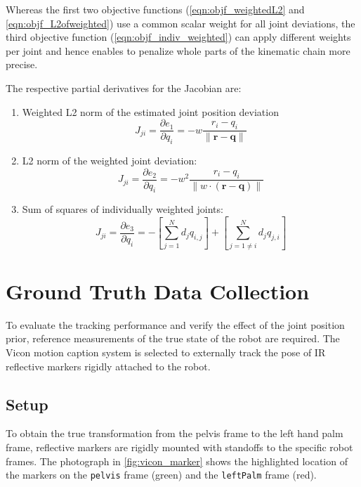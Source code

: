 Whereas the first two objective functions (\ref{eqn:objf_weightedL2} and \ref{eqn:objf_L2ofweighted}) use a common scalar weight for all joint deviations, the third objective function (\ref{eqn:objf_indiv_weighted}) can apply different weights per joint and hence enables to penalize whole parts of the kinematic chain more precise.

The respective partial derivatives for the Jacobian are:
\begin{enumerate}
\item Weighted L2 norm of the estimated joint position deviation
\begin{equation}
J_{ji} = \frac{\partial e_1}{\partial q_i} = -w \frac{r_i - q_i}{\lVert \mathbf{r} - \mathbf{q} \rVert}
\end{equation}

\item L2 norm of the weighted joint deviation:
\begin{equation}
J_{ji} = \frac{\partial e_2}{\partial q_i} = -w^2 \frac{r_i - q_i}{\lVert w \cdot (\mathbf{r} - \mathbf{q}) \rVert}
\end{equation}

\item Sum of squares of individually weighted joints:
\begin{equation}
J_{ji} = \frac{\partial e_3}{\partial q_i} = - \left[ \sum_{j=1}^N d_jq_{i,j}\right] + \left[ \sum_{j=1 \neq i}^N d_jq_{j,i}\right]
\end{equation}
\end{enumerate}


\section{Ground Truth Data Collection}

To evaluate the tracking performance and verify the effect of the joint position prior, reference measurements of the true state of the robot are required. The Vicon motion caption system is selected to externally track the pose of IR reflective markers rigidly attached to the robot.

\subsection{Setup}

To obtain the true transformation from the pelvis frame to the left hand palm frame, reflective markers are rigidly mounted with standoffs to the specific robot frames. The photograph in \cref{fig:vicon_marker} shows the highlighted location of the markers on the \texttt{pelvis} frame (green) and the \texttt{leftPalm} frame (red).

